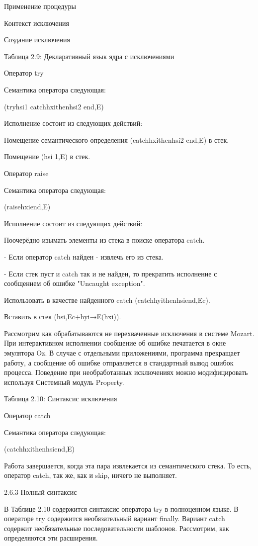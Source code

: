 Применение процедуры

Контекст исключения

Создание исключения

Таблица 2.9: Декларативный язык ядра с исключениями

Оператор try

Семантика оператора следующая:

(tryhsi1 catchhxithenhsi2 end,E)

Исполнение состоит из следующих действий:

Помещение семантического определения (catchhxithenhsi2 end,E) в стек.

Помещение  (hsi 1,E) в стек.

Оператор raise

Семантика оператора следующая:

(raisehxiend,E)

Исполнение состоит из следующих действий:

Поочерёдно изымать элементы из стека в поиске оператора catch.

- Если оператор catch найден - извлечь его из стека.

- Если стек пуст и catch так и не найден, то прекратить исполнение с сообщением об ошибке "Uncaught exception".

Использовать в качестве найденного catch (catchhyithenhsiend,Ec).

Вставить в стек (hsi,Ec+{hyi→E(hxi)}).

Рассмотрим как обрабатываются не перехваченные исключения в системе Mozart. При интерактивном исполнении сообщение об ошибке печатается в окне эмулятора Oz. В случае с отдельными приложениями, программа прекращает работу, а сообщение об ошибке отправляется в стандартный вывод ошибок процесса. Поведение при необработанных исключениях можно модифицировать используя Системный модуль Property.

Таблица 2.10: Синтаксис исключения

Оператор catch

Семантика оператора следующая:

(catchhxithenhsiend,E)

Работа завершается, когда эта пара извлекается из семантического стека. То есть, оператор catch, так же, как и skip, ничего не выполняет.

2.6.3 Полный синтаксис

В Таблице 2.10 содержится синтаксис оператора try в полноценном языке. В операторе try содержится необязательный вариант finally. Вариант catch содержит необязательные последовательности шаблонов. Рассмотрим, как определяются эти расширения.

